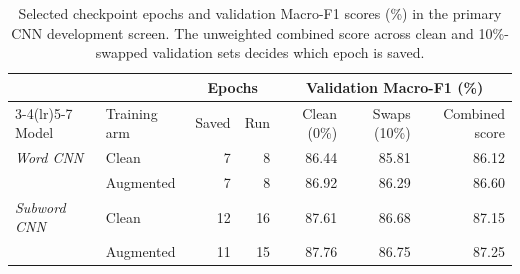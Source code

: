 \begin{table}[H]\centering\normalsize\setlength{\tabcolsep}{4.5pt}
\begin{tabular}{llrrrrr}\toprule
 & & \multicolumn{2}{c}{Epochs} & \multicolumn{3}{c}{Validation Macro-F1 (\%)} \\
\cmidrule(lr){3-4}\cmidrule(lr){5-7}
Model & Training arm & Saved & Run & Clean (0\%) & Swaps (10\%) & Combined score \\\midrule
\textit{Word CNN} & Clean & 7 & 8 & 86.44 & 85.81 & 86.12 \\
 & Augmented & 7 & 8 & 86.92 & 86.29 & 86.60 \\
\textit{Subword CNN} & Clean & 12 & 16 & 87.61 & 86.68 & 87.15 \\
 & Augmented & 11 & 15 & 87.76 & 86.75 & 87.25 \\
\bottomrule
\end{tabular}
\caption[Selected CNN checkpoints]{Selected checkpoint epochs and validation Macro-F1 scores (\%) in the primary CNN development screen. The unweighted combined score across clean and 10\%-swapped validation sets decides which epoch is saved.}
\label{tab:chosen-epochs}
\end{table}
